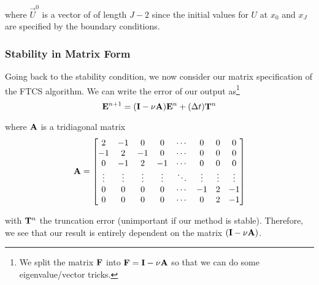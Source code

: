 \documentclass[12pt]{article}
\newlength\tindent
\renewcommand{\indent}{\hspace*{\tindent}}
\begin{document}
where $\vec{U}^0$ is a vector of of length $J - 2$ since the initial values for $U$ at $x_0$ and $x_J$ are specified by the boundary conditions.

\subsubsection{Stability in Matrix Form}

\indent Going back to the stability condition, we now consider our matrix specification of the FTCS algorithm. We can write the error of our output as\footnote{We split the matrix ${\bf F}$ into ${\bf F} = {\bf I} - \nu {\bf A}$ so that we can do some eigenvalue/vector tricks.}
\begin{equation*}
	{\bf E}^{n + 1} = ({\bf I} - \nu{\bf A}){\bf E}^n + (\Delta t){\bf T}^n
\end{equation*}

where ${\bf A}$ is a tridiagonal matrix
\begin{equation*}
	{\bf A} =
	\begin{bmatrix}
		2 & -1 & 0 & 0 & \cdots & 0 & 0 & 0 \\
		-1 & 2 & -1 & 0 & \cdots & 0 & 0 & 0 \\
		0 & -1 & 2 & -1 & \cdots & 0 & 0 & 0 \\
		\vdots & \vdots & \vdots & \vdots & \ddots & \vdots & \vdots & \vdots \\
		0 & 0 & 0 & 0 & \cdots & -1 & 2 & -1 \\
		0 & 0 & 0 & 0 & \cdots & 0 & 2 & -1 
	\end{bmatrix}
\end{equation*}

with ${\bf T}^n$ the truncation error (unimportant if our method is stable). Therefore, we see that our result is entirely dependent on the matrix $({\bf I} - \nu {\bf A})$.
\end{document}
